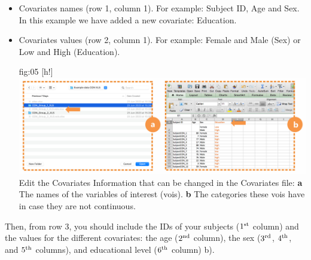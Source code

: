 \documentclass[justified]{tufte-handout}
\begin{document}
\begin{itemize}

\item Covariates names (row 1, column 1). 
For example: Subject ID, Age and Sex. In this example we have added a new covariate: Education.

\item Covariates values (row 2, column 1). 
For example: Female and Male (Sex) or Low and High (Education).

	{fig:05}
	{
	[h!]
	\includegraphics{tut_gr_conn/fig05.png}
	}
	{Edit the Covariates}
	{
	Information that can be changed in the Covariates file: 
	{\bf a} The names of the variables of interest (vois).
	{\bf b} The categories these vois have in case they are not continuous.
	}


\end{itemize}
Then, from row 3, you should include the IDs of your subjects ($1^{\rm st}$ column) and the values for the different covariates: the age ($2^{\rm nd}$ column), the sex ($3^{\rm rd}$, $4^{\rm th}$, and $5^{\rm th}$ columns), and educational level ($6^{\rm th}$ column) b).	
\end{document}
